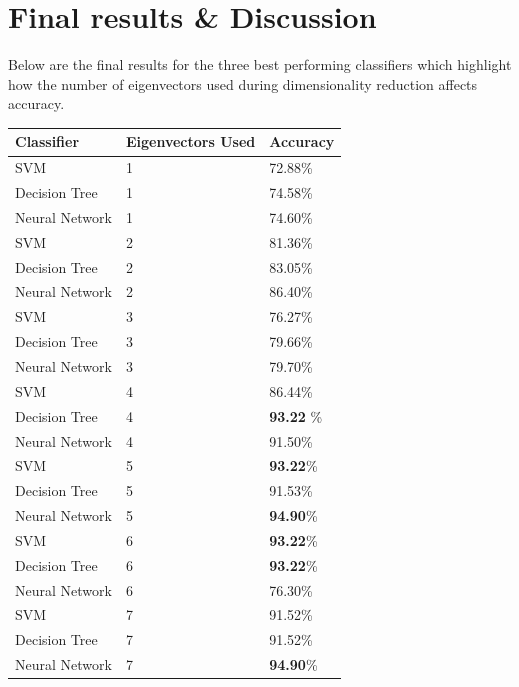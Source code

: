 \section {Final results \& Discussion}
Below are the final results for the three best performing classifiers which highlight how the number of eigenvectors used during dimensionality reduction affects accuracy.  
\begin{table}[h]
\begin{center}
    \begin{tabular}{ | l | l | l |}
    \hline
    Classifier & Eigenvectors Used & Accuracy\\ \hline
    SVM & 1 & 72.88\%\\ \hline
    Decision Tree & 1 & 74.58\%\\ \hline
    Neural Network & 1 & 74.60\%\\ \hline
    
    SVM & 2 & 81.36\%\\ \hline
    Decision Tree & 2 & 83.05\%\\ \hline
    Neural Network & 2 & 86.40\%\\ \hline
    
    SVM & 3 & 76.27\%\\ \hline
    Decision Tree & 3 & 79.66\%\\ \hline
    Neural Network & 3 & 79.70\%\\ \hline
    
    SVM & 4 & 86.44\%\\ \hline
    Decision Tree & 4 & {\bf93.22} \%\\ \hline
    Neural Network & 4 & 91.50\%\\ \hline
    
    SVM & 5 & {\bf93.22}\%\\ \hline
    Decision Tree & 5 & 91.53\%\\ \hline
    Neural Network & 5 & {\bf94.90}\%\\ \hline
    
    SVM & 6 & {\bf93.22}\%\\ \hline
    Decision Tree & 6 & {\bf93.22}\%\\ \hline
    Neural Network & 6 & 76.30\%\\ \hline
    
    SVM & 7 & 91.52\%\\ \hline
    Decision Tree & 7 & 91.52\%\\ \hline
    Neural Network & 7 & {\bf94.90}\%\\ \hline
    \hline
    \end{tabular}
\end{center}
\end{table}

